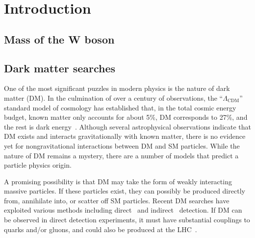 \chapter{Introduction}

\section{Mass of the W boson}

\section{Dark matter searches}

One of the most significant puzzles in modern physics is the nature of dark matter (DM).
In the culmination of over a century of observations, the ``$\Lambda_{\mathrm{CDM}}$'' standard model of cosmology
has established that, in the total cosmic energy budget,
known matter only accounts for about 5\%, DM corresponds to 27\%, and the rest is dark energy~\cite{Hinshaw_2013}.
Although several astrophysical observations indicate that DM exists and interacts gravitationally with known matter,
there is no evidence yet for nongravitational interactions between DM and SM particles.
While the nature of DM remains a mystery, there are a number of models that predict a particle physics origin. 

A promising possibility is that DM may take the form of weakly interacting massive particles.
If these particles exist, they can possibly be produced directly from, annihilate into, or scatter off SM particles.
Recent DM searches have exploited various methods including direct~\cite{Cushman:2013zza} and indirect~\cite{Buckley:2013bha} detection.
If DM can be observed in direct detection experiments,
it must have substantial couplings to quarks and/or gluons, and could also be produced at the LHC~\cite{Beltran:2010ww,Goodman:2010yf,Bai:2010hh,Goodman:2010ku,Fox:2011pm,Rajaraman:2011wf}.

